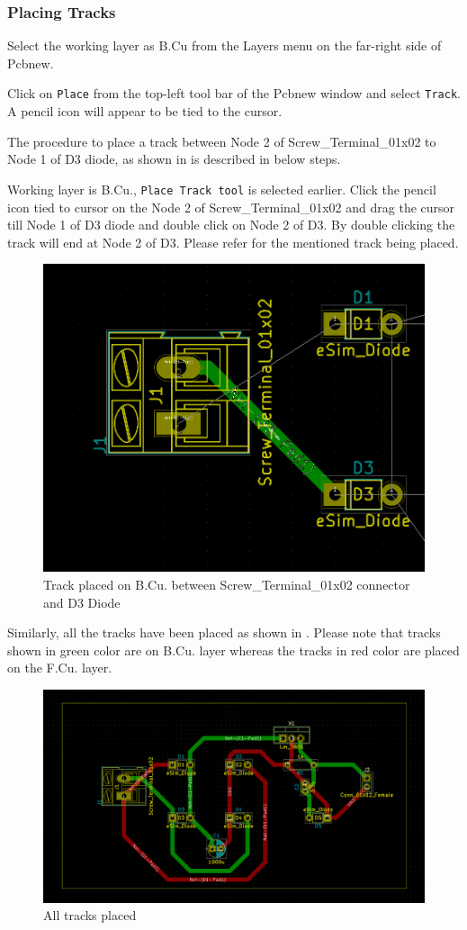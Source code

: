 \subsubsection{Placing Tracks}
\begin{compactenum}
\item Select the working layer as B.Cu from the Layers menu on the far-right side of Pcbnew.
\item Click on \texttt{Place} from the top-left tool bar of the Pcbnew window and select \texttt{Track}. A pencil icon will appear to be tied to the cursor.
\item The procedure to place a track between Node 2 of Screw\_Terminal\_01x02 to Node 1 of D3 diode, as shown in  is described in below steps.
\item Working layer is B.Cu., \texttt{Place Track tool} is selected earlier. Click the pencil icon tied to cursor on the Node 2 of Screw\_Terminal\_01x02 and drag the cursor till Node 1 of D3 diode and double click on Node 2 of D3. By double clicking the track will end at Node 2 of D3. Please refer  for the mentioned track being placed.
\begin{figure}
\centering
\includegraphics[height=0.4\textwidth]{firsttrack.png}
\caption{Track placed on B.Cu. between Screw\_Terminal\_01x02 connector and D3 Diode}
\label{D3node1track}
\end{figure}
\item Similarly, all the tracks have been placed as shown in . Please note that tracks shown in green color are on B.Cu. layer whereas the tracks in red color are placed on the F.Cu. layer. 
\begin{figure}
\centering
\includegraphics[height=0.4\textwidth]{alltracks.png}
\caption{All tracks placed}
\label{alltracks}
\end{figure}
\end{compactenum}

